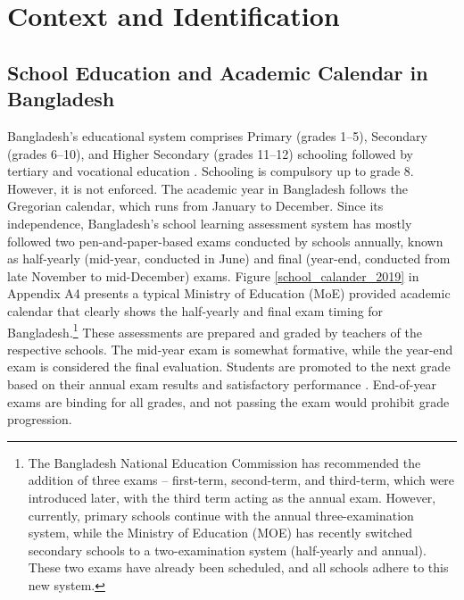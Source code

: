 \documentclass[12pt,letterpaper]{article}
\newcommand{\0}{\ensuremath{\mbox{\boldmath $0$}}}
\begin{document}



\section{Context and Identification\label{sec.id}}
\subsection{School Education and Academic Calendar in Bangladesh}

Bangladesh’s educational system comprises Primary (grades 1–5), Secondary (grades 6–10), and Higher Secondary (grades 11–12) schooling followed by tertiary and vocational education \citep{kono2018primary}. Schooling is compulsory up to grade 8. However, it is not enforced. The academic year in Bangladesh follows the Gregorian calendar, which runs from January to December. Since its independence, Bangladesh’s school learning assessment system has mostly followed two pen-and-paper-based exams conducted by schools annually, known as half-yearly (mid-year, conducted in June) and final (year-end, conducted from late November to mid-December) exams. Figure \ref{school_calander_2019} in Appendix A4 presents a typical Ministry of Education (MoE) provided academic calendar that clearly shows the half-yearly and final exam timing for Bangladesh.\footnote{The Bangladesh National Education Commission has recommended the addition of three exams – first-term, second-term, and third-term, which were introduced later, with the third term acting as the annual exam. However, currently, primary schools continue with the annual three-examination system, while the Ministry of Education (MOE) has recently switched secondary schools to a two-examination system (half-yearly and annual). These two exams have already been scheduled, and all schools adhere to this new system.} These assessments are prepared and graded by teachers of the respective schools. The mid-year exam is somewhat formative, while the year-end exam is considered the final evaluation. Students are promoted to the next grade based on their annual exam results and satisfactory performance \citep{zhongming2017innovative}. End-of-year exams are binding for all grades, and not passing the exam would prohibit grade progression. 
\end{document}
